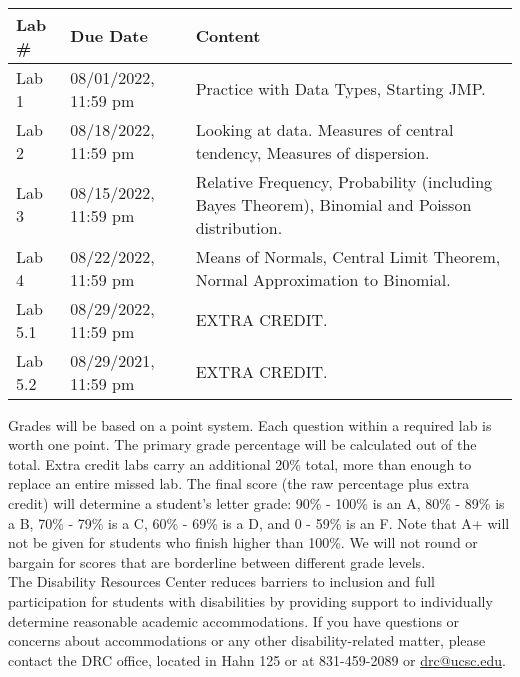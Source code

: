\documentclass[11pt]{article}
\begin{document}
  \vspace{.05in}  \\ 
\indent \begin{tabular}{| l | l |p{10cm}|} \hline
Lab \# & Due Date & Content \\ \hline
Lab 1 & 08/01/2022, 11:59 pm &Practice with Data Types, Starting JMP. \\ \hline

Lab 2 & 08/18/2022, 11:59 pm & Looking at data. Measures of central tendency, Measures of dispersion. \\ \hline

Lab 3 & 08/15/2022, 11:59 pm &Relative Frequency, Probability (including Bayes Theorem), Binomial and Poisson distribution.\\ \hline

Lab 4 & 08/22/2022, 11:59 pm & Means of Normals, Central Limit Theorem, Normal Approximation to Binomial.\\ \hline

Lab 5.1 & 08/29/2022, 11:59 pm & EXTRA CREDIT. \\ \hline


Lab 5.2 & 08/29/2021, 11:59 pm & EXTRA CREDIT. \\ \hline
\end{tabular}

\vspace{.3in}

 Grades will be based on a point system. Each
question within a required lab is worth one point. The primary
grade percentage will be calculated out of the total. Extra credit labs carry
an additional 20\% total, more than enough to replace an entire missed lab.
The final score (the raw percentage plus extra credit) will determine a
student's letter grade: 90\% - 100\% is an A, 80\% - 89\% is a B, 70\% - 79\%
is a C, 60\% - 69\% is a D, and 0 - 59\% is an F. Note that A+ will not be
given for students who finish higher than 100\%. We will not round or bargain
for scores that are borderline between different grade levels. \\

 The Disability Resources Center reduces barriers to inclusion and full participation for students
with disabilities by providing support to individually determine reasonable academic
accommodations. If you have questions or concerns about accommodations or any other
disability-related matter, please contact the DRC office, located in Hahn 125 or at 831-459-2089
or \href{mailto:drc@ucsc.edu}{drc@ucsc.edu}. \\
\end{document}
